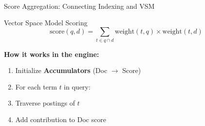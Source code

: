 \documentclass[aspectratio=169]{beamer}
\newif\ifanimated
\newcommand{\cpause}{\ifanimated\pause\fi}
\begin{document}
\begin{frame}{Score Aggregation: Connecting Indexing and VSM}
\begin{block}{Vector Space Model Scoring}
\[ \text{score}(q, d) = \sum_{t \in q \cap d} \text{weight}(t, q) \times \text{weight}(t, d) \]
\end{block}
\cpause

\textbf{How it works in the engine:}
\begin{enumerate}
    \item Initialize \textbf{Accumulators} (Doc $\rightarrow$ Score)
    \item For each term $t$ in query:
    \item Traverse postings of $t$
    \item Add contribution to Doc score
\end{enumerate}












\cpause
\end{frame}
\end{document}
